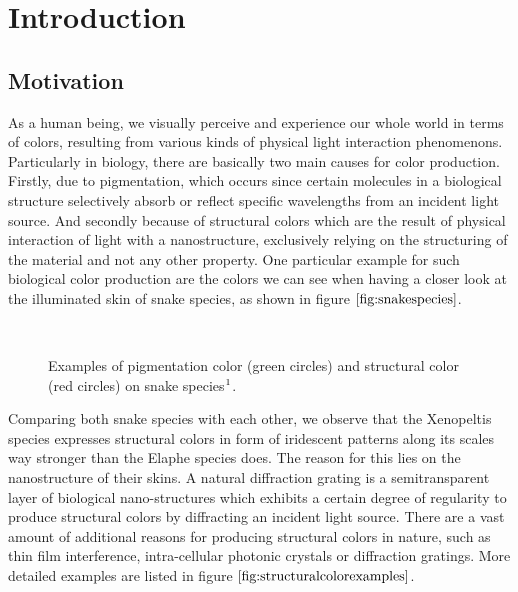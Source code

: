\chapter{Introduction}
\section{Motivation}
As a human being, we visually perceive and experience our whole world in terms of colors, resulting from various kinds of physical light interaction phenomenons. Particularly in biology, there are basically two main causes for color production. Firstly, due to pigmentation, which occurs since certain molecules in a biological structure selectively absorb or reflect specific wavelengths from an incident light source. And secondly because of structural colors which are the result of physical interaction of light with a nanostructure, exclusively relying on the structuring of the material and not any other property. One particular example for such biological color production are the colors we can see when having a closer look at the illuminated skin of snake species, as shown in figure $\ref{fig:snakespecies}$.

\begin{figure}[H]
  \centering
~
  \caption[example biological color production]{Examples of pigmentation color (green circles) and structural color (red circles) on snake species$\footnotemark$.}
  \label{fig:snakespecies}
\end{figure}

Comparing both snake species with each other, we observe that the Xenopeltis species expresses structural colors in form of iridescent patterns along its scales way stronger than the Elaphe species does. The reason for this lies on the nanostructure of their skins. A natural diffraction grating is a semitransparent layer of biological nano-structures which exhibits a certain degree of regularity to produce structural colors by diffracting an incident light source. There are a vast amount of additional reasons for producing structural colors in nature, such as thin film interference, intra-cellular photonic crystals or diffraction gratings. More detailed examples are listed in figure $\ref{fig:structuralcolorexamples}$. 

